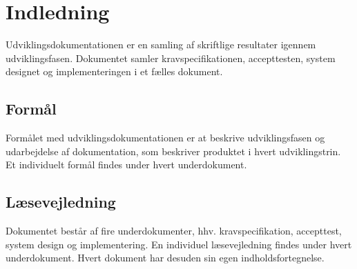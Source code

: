 \chapter*{Indledning}
Udviklingsdokumentationen er en samling af skriftlige resultater igennem udviklingsfasen. Dokumentet samler kravspecifikationen, accepttesten, system designet og implementeringen i et fælles dokument. 

\section*{Formål}
Formålet med udviklingsdokumentationen er at beskrive udviklingsfasen og udarbejdelse af dokumentation, som beskriver produktet i hvert udviklingstrin. Et individuelt formål findes under hvert underdokument. 

\section*{Læsevejledning}
Dokumentet består af fire underdokumenter, hhv. kravspecifikation, accepttest, system design og implementering. En individuel læsevejledning findes under hvert underdokument. Hvert dokument har desuden sin egen indholdsfortegnelse. 